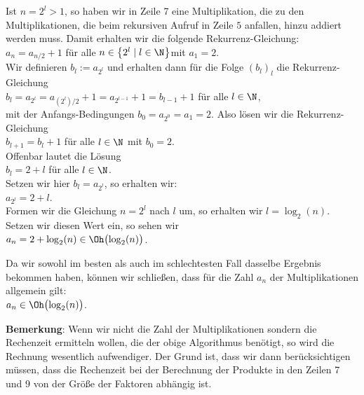 Ist $n = 2^l > 1$, so  haben wir in Zeile 7 eine Multiplikation, die zu den Multiplikationen, die beim
rekursiven Aufruf in Zeile $5$ anfallen, hinzu addiert werden muss.  Damit erhalten wir
die folgende Rekurrenz-Gleichung: \\[0.1cm]
\hspace*{1.3cm} $a_n = a_{n/2} + 1$ \qquad f\"ur alle $n \in \left\{2^l \mid l \in \N\right\}$\quad mit $a_1 = 2$. \\[0.1cm]
Wir definieren $b_l := a_{2^l}$ und erhalten dann f\"ur die Folge $(b_l)_l$ die
Rekurrenz-Gleichung \\[0.1cm]
\hspace*{1.3cm} 
$b_l = a_{2^l} = a_{(2^l)/2} + 1 = a_{2^{l-1}} + 1 = b_{l-1} + 1$ \qquad f\"ur alle $l\in\N$, \\[0.1cm]
mit der Anfangs-Bedingungen $b_0 = a_{2^0} = a_1 = 2$.
Also l\"osen wir die Rekurrenz-Gleichung \\[0.1cm]
\hspace*{1.3cm} $b_{l+1} = b_l + 1$ \qquad f\"ur alle $l \in \N$ \quad mit $b_0 = 2$.\\[0.1cm]
Offenbar lautet die L\"osung \\[0.1cm]
\hspace*{1.3cm} $b_l = 2 + l$ \qquad f\"ur alle $l\in\N$.
\\[0.1cm]
Setzen wir hier $b_l = a_{2^l}$, so erhalten wir: \\[0.1cm]
\hspace*{1.3cm} $a_{2^l} = 2 + l$. \\[0.1cm]
Formen wir die Gleichung $n = 2^l$ nach $l$ um, so erhalten wir $l =
\log_2(n)$. Setzen wir diesen Wert 
ein, so sehen wir \\[0.1cm]
\hspace*{1.3cm} $a_n = 2 + \log_2(n) \in \Oh\bigl(\log_2(n)\bigr)$.
\vspace*{0.3cm}

Da wir sowohl im besten als auch im schlechtesten Fall dasselbe Ergebnis bekommen haben,
k\"onnen wir schlie{\ss}en, dass f\"ur die Zahl $a_n$ der Multiplikationen allgemein gilt:\\[0.1cm]
\hspace*{1.3cm} $a_n \in \Oh\bigl(\log_2(n)\bigr)$.
\vspace*{0.3cm}

\noindent
\textbf{Bemerkung}:  Wenn wir nicht die Zahl der Multiplikationen sondern die Rechenzeit
ermitteln wollen, die der obige Algorithmus ben\"otigt, so wird die Rechnung wesentlich
aufwendiger.  Der Grund ist, dass wir dann ber\"ucksichtigen m\"ussen, dass die Rechenzeit bei
der Berechnung der Produkte in den Zeilen 7 und 9 von der Gr\"o{\ss}e der Faktoren abh\"angig ist.
\vspace*{0.3cm}

